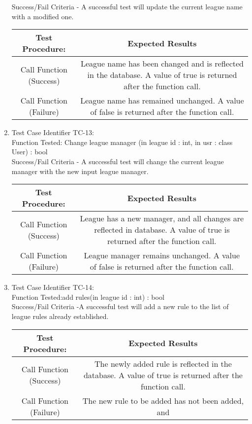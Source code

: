\begin{enumerate}
    Success/Fail Criteria - A successful test will update the current league
    name with a modified one.\\
    \begin{tabular}{| c | c |}
    \hline
    \textbf{Test Procedure:} & \textbf{Expected Results} \\ \hline
    Call Function (Success) & League name has been changed and is reflected in
    the database. A value of true is returned after the function call. \\ \hline
    Call Function (Failure) & League name has remained unchanged. A value of
    false is returned after the function call. \\ \hline
    \end{tabular}
  \item
  Test Case Identifier TC-13:\\
    Function Tested: Change league manager (in league id : int, in usr : class
        User) : bool\\
    Success/Fail Criteria - A successful test will change the current league
    manager with the new input league manager. \\
    \begin{tabular}{| c | c |}
    \hline
    \textbf{Test Procedure:} & \textbf{Expected Results} \\ \hline
    Call Function (Success) &League has a new manager, and all changes are
    reflected in database. A value of true is returned after the function call.
    \\ \hline
    Call Function (Failure) & League manager remains unchanged. A value of false
    is returned after the function call. \\ \hline
    \end{tabular}
  \item
  Test Case Identifier TC-14:\\
    Function Tested:add rules(in league id : int) : bool\\
    Success/Fail Criteria -A successful test will add a new rule to the list of
    league rules already established.  \\
    \begin{tabular}{| c | c |}
    \hline
    \textbf{Test Procedure:} & \textbf{Expected Results} \\ \hline
    Call Function (Success) &The newly added rule is reflected in the database.
    A value of true is returned after the function call.
    \\ \hline
    Call Function (Failure) & The new rule to be added has not been added, and

\end{tabular}
\end{enumerate}
